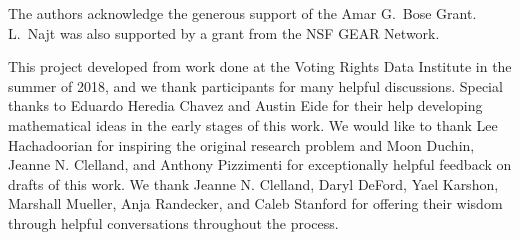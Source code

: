 
 The authors acknowledge the generous support of the Amar G.\ Bose Grant. L.\ Najt was also supported by a grant from the NSF GEAR Network.

This project developed from work done at the Voting Rights Data Institute in the summer of 2018, and we thank participants for many helpful discussions. Special thanks to Eduardo Heredia Chavez and Austin Eide for their help developing mathematical ideas in the early stages of this work. We would like to thank Lee Hachadoorian for inspiring the original research problem and Moon Duchin, Jeanne N. Clelland, and Anthony Pizzimenti for exceptionally helpful feedback on drafts of this work.  We thank Jeanne N. Clelland, Daryl DeFord, Yael Karshon, Marshall Mueller, Anja Randecker, and Caleb Stanford for offering their wisdom through helpful conversations throughout the process.